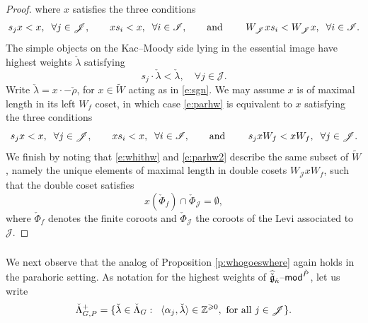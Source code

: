 \documentclass[11pt,reqno]{amsart}
\newcommand{\cgk}{\widehat{\check{\mathfrak{g}}}_{\check{\kappa}}}
\theoremstyle{remark}
\numberwithin{equation}{section}
\newcommand{\sJ}{\mathscr{J}}
\renewcommand{\mod}{\text{\textendash}\mathsf{mod}}
\begin{document}
\begin{proof}
	where $x$ satisfies the three conditions 
	\begin{align} \label{e:whithw}
	s_j x < x, \hspace{2mm}  \forall j \in \sJ, \quad \quad xs_i < x, 
	\hspace{2mm}  
	\forall i 
	\in \mathscr{I}, \quad \quad \text{and } \quad \quad 	
	W_\sJ x s_i < W_\sJ x,  \hspace{2mm}  \forall i \in \mathscr{I}.
	\end{align}
	The simple objects on the Kac--Moody side lying in the essential image have 
	highest weights $\check{\lambda}$ satisfying 
	\begin{equation} \label{e:parhw} s_j \cdot \check{\lambda} < 
	\check{\lambda}, 
	\quad \forall j \in \sJ.
	\end{equation}
	Write $\check{\lambda} = x \cdot -\check{\rho}$, for $x \in \widetilde{W}$ 
	acting as in \eqref{e:sgn}. We may assume $x$ is of maximal length in its 
	left 
	$W_f$ coset, in which case \eqref{e:parhw} is equivalent to $x$ satisfying 
	the 
	three conditions 
	\begin{equation}\label{e:parhw2}
	s_j x < x, \hspace{2mm}  \forall j \in \sJ, \quad \quad xs_i < x, 
	\hspace{2mm}  
	\forall i 
	\in \mathscr{I}, \quad \quad \text{and } \quad \quad 	
	s_j x W_f < x W_f,  \hspace{2mm}  \forall j \in \mathscr{J}.
	\end{equation}
	We finish by noting that \eqref{e:whithw} and \eqref{e:parhw2} describe the 
	same subset of $\widetilde{W}$, namely the unique elements of maximal 
	length in 
	double cosets $W_\sJ x W_f$, such that the double coset satisfies
	\[  x( \check{\Phi}_f) \cap \check{\Phi}_{\sJ} = \emptyset,
	\]
	where $\check{\Phi}_f$ denotes the finite coroots and $\check{\Phi}_{\sJ}$ 
	the 
	coroots of the Levi associated to $\mathscr{J}$. \end{proof}





\subsubsection{}

We next observe that the analog of Proposition \ref{p:whogoeswhere} again holds 
in the parahoric setting. As notation for the highest weights of 
$\cgk\mod^{\check{P}}$, let us write
%
\[ \check{\Lambda}_{G, P}^+ = \{ \check{\lambda} \in 
\check{\Lambda}_G:\hspace{2mm} \langle 
\alpha_j, \check{\lambda} \rangle \in \mathbb{Z}^{\geqslant 0}, \text{  for 
	all 
} j \in 
\sJ \}. 
\]
%
\end{document}
